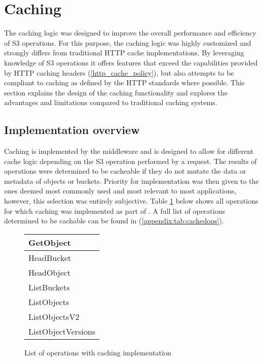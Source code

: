 \section{Caching}

The caching logic was designed to improve the overall performance and efficiency of S3 operations. For this purpose, the caching logic was highly customized and strongly differs from traditional HTTP cache implementations. By leveraging knowledge of S3 operations it offers features that exceed the capabilities provided by HTTP caching headers (\ref{http_cache_policy}), but also attempts to be compliant to caching as defined by the HTTP standards where possible. This section explains the design of the caching functionality and explores the advantages and limitations compared to traditional caching systems.

\subsection{Implementation overview}

Caching is implemented by the  middleware and is designed to allow for different cache logic depending on the S3 operation performed by a request. The results of operations were determined to be cacheable if they do not mutate the data or metadata of objects or buckets. Priority for implementation was then given to the ones deemed most commonly used and most relevant to most applications, however, this selection was entirely subjective. Table \ref{tab:cachedops} below shows all operations for which caching was implemented as part of . A full list of operations determined to be cachable can be found in (\ref{appendix:tab:cachedops}).
\begin{figure}[h]
	\begin{center}
		\begin{tabular}{| l |}
			\hline
			GetObject \\ \hline
			HeadBucket \\ \hline
			HeadObject \\ \hline
			ListBuckets \\ \hline
			ListObjects \\ \hline
			ListObjectsV2 \\ \hline
			ListObjectVersions \\ \hline
		\end{tabular}
	\end{center}
	\caption{List of operations with caching implementation}
	\label{tab:cachedops}
\end{figure}

